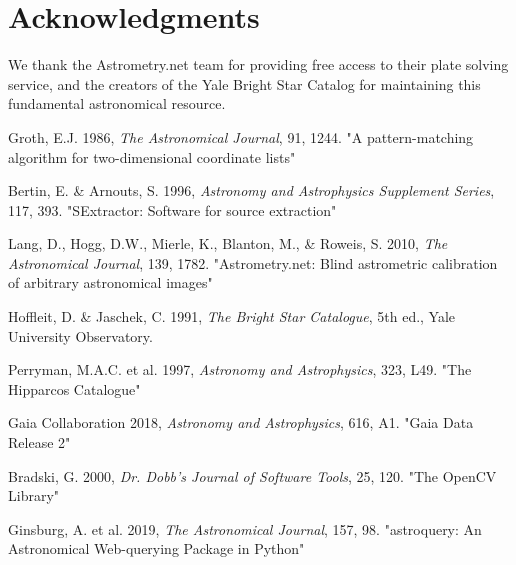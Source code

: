 \documentclass[11pt,a4paper]{article}
\begin{document}
\section*{Acknowledgments}

We thank the Astrometry.net team for providing free access to their plate solving service, and the creators of the Yale Bright Star Catalog for maintaining this fundamental astronomical resource.

\begin{thebibliography}{9}

Groth, E.J. 1986, \textit{The Astronomical Journal}, 91, 1244.
"A pattern-matching algorithm for two-dimensional coordinate lists"

Bertin, E. \& Arnouts, S. 1996, \textit{Astronomy and Astrophysics Supplement Series}, 117, 393.
"SExtractor: Software for source extraction"

Lang, D., Hogg, D.W., Mierle, K., Blanton, M., \& Roweis, S. 2010, \textit{The Astronomical Journal}, 139, 1782.
"Astrometry.net: Blind astrometric calibration of arbitrary astronomical images"

Hoffleit, D. \& Jaschek, C. 1991, \textit{The Bright Star Catalogue}, 5th ed., Yale University Observatory.

Perryman, M.A.C. et al. 1997, \textit{Astronomy and Astrophysics}, 323, L49.
"The Hipparcos Catalogue"

Gaia Collaboration 2018, \textit{Astronomy and Astrophysics}, 616, A1.
"Gaia Data Release 2"

Bradski, G. 2000, \textit{Dr. Dobb's Journal of Software Tools}, 25, 120.
"The OpenCV Library"

Ginsburg, A. et al. 2019, \textit{The Astronomical Journal}, 157, 98.
"astroquery: An Astronomical Web-querying Package in Python"

\end{thebibliography}
\end{document}
